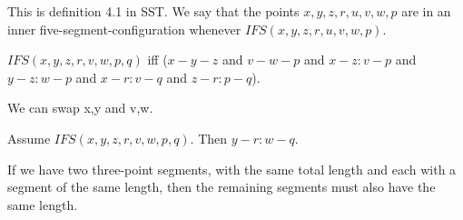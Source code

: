 \documentclass{article}
\begin{document}
  This is definition 4.1 in SST. We say that the points $x,y,z,r,u,v,w,p$ are in an inner five-segment-configuration whenever $IFS(x,y,z,r,u,v,w,p)$.

  \begin{forthel}
    \begin{definition}[IFS]
      $IFS(x,y,z,r,v,w,p,q)$ iff ($x-y-z$ and $v-w-p$ and $x-z : v-p$ and $y-z : w-p$ and $x-r : v-q$ and $z-r : p-q$).
    \end{definition}
  \end{forthel}

  We can swap x,y and v,w.

  \begin{forthel}
    \begin{axiom}[L4o2]
      Assume $IFS(x,y,z,r,v,w,p,q)$. Then $y-r : w-q$.
    \end{axiom}
  \end{forthel}

  If we have two three-point segments, with the same total length and each with a segment of the same length, then the remaining segments must also have the same length.

\end{document}
